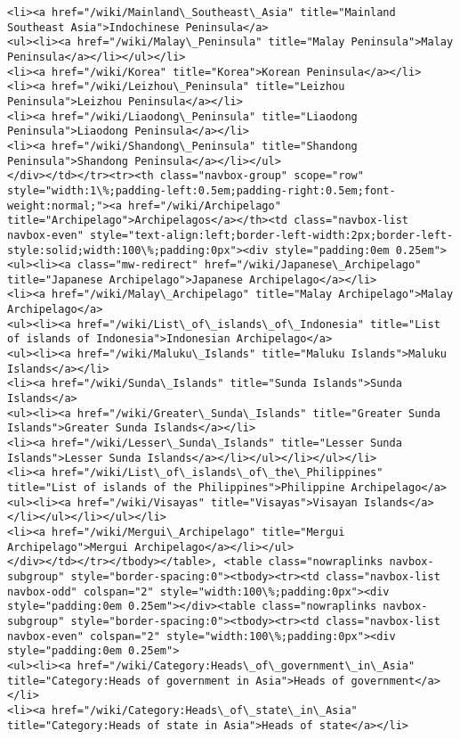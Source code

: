 \documentclass[11pt]{article}
\begin{document}
\begin{Verbatim}[commandchars=\\\{\}]
<li><a href="/wiki/Mainland\_Southeast\_Asia" title="Mainland Southeast Asia">Indochinese Peninsula</a>
<ul><li><a href="/wiki/Malay\_Peninsula" title="Malay Peninsula">Malay Peninsula</a></li></ul></li>
<li><a href="/wiki/Korea" title="Korea">Korean Peninsula</a></li>
<li><a href="/wiki/Leizhou\_Peninsula" title="Leizhou Peninsula">Leizhou Peninsula</a></li>
<li><a href="/wiki/Liaodong\_Peninsula" title="Liaodong Peninsula">Liaodong Peninsula</a></li>
<li><a href="/wiki/Shandong\_Peninsula" title="Shandong Peninsula">Shandong Peninsula</a></li></ul>
</div></td></tr><tr><th class="navbox-group" scope="row" style="width:1\%;padding-left:0.5em;padding-right:0.5em;font-weight:normal;"><a href="/wiki/Archipelago" title="Archipelago">Archipelagos</a></th><td class="navbox-list navbox-even" style="text-align:left;border-left-width:2px;border-left-style:solid;width:100\%;padding:0px"><div style="padding:0em 0.25em">
<ul><li><a class="mw-redirect" href="/wiki/Japanese\_Archipelago" title="Japanese Archipelago">Japanese Archipelago</a></li>
<li><a href="/wiki/Malay\_Archipelago" title="Malay Archipelago">Malay Archipelago</a>
<ul><li><a href="/wiki/List\_of\_islands\_of\_Indonesia" title="List of islands of Indonesia">Indonesian Archipelago</a>
<ul><li><a href="/wiki/Maluku\_Islands" title="Maluku Islands">Maluku Islands</a></li>
<li><a href="/wiki/Sunda\_Islands" title="Sunda Islands">Sunda Islands</a>
<ul><li><a href="/wiki/Greater\_Sunda\_Islands" title="Greater Sunda Islands">Greater Sunda Islands</a></li>
<li><a href="/wiki/Lesser\_Sunda\_Islands" title="Lesser Sunda Islands">Lesser Sunda Islands</a></li></ul></li></ul></li>
<li><a href="/wiki/List\_of\_islands\_of\_the\_Philippines" title="List of islands of the Philippines">Philippine Archipelago</a>
<ul><li><a href="/wiki/Visayas" title="Visayas">Visayan Islands</a></li></ul></li></ul></li>
<li><a href="/wiki/Mergui\_Archipelago" title="Mergui Archipelago">Mergui Archipelago</a></li></ul>
</div></td></tr></tbody></table>, <table class="nowraplinks navbox-subgroup" style="border-spacing:0"><tbody><tr><td class="navbox-list navbox-odd" colspan="2" style="width:100\%;padding:0px"><div style="padding:0em 0.25em"></div><table class="nowraplinks navbox-subgroup" style="border-spacing:0"><tbody><tr><td class="navbox-list navbox-even" colspan="2" style="width:100\%;padding:0px"><div style="padding:0em 0.25em">
<ul><li><a href="/wiki/Category:Heads\_of\_government\_in\_Asia" title="Category:Heads of government in Asia">Heads of government</a></li>
<li><a href="/wiki/Category:Heads\_of\_state\_in\_Asia" title="Category:Heads of state in Asia">Heads of state</a></li>

\end{Verbatim}
\end{document}
